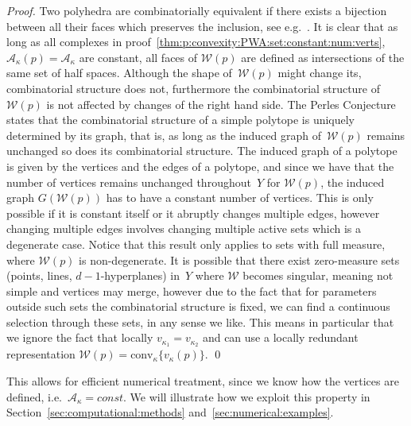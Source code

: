 \documentclass[smallextended]{svjour3}       %
\numberwithin{equation}{section}
\providecommand{\conv}{\text{conv}}
\begin{document}
\begin{proof}
Two polyhedra are combinatorially equivalent if there exists a bijection between all their faces which preserves the inclusion, see e.g.~\cite{Ziegler:1995}.
%
It is clear that as long as all complexes in proof~\ref{thm:p:convexity:PWA:set:constant:num:verts}, $\mathcal A_\kappa(p)=\mathcal A_\kappa$ are constant, all faces of $\mathcal W(p)$ are defined as intersections of the same set of half spaces.
%
Although the shape of~$\mathcal W(p)$ might change its, combinatorial structure does not, furthermore the combinatorial structure of $\mathcal W(p)$ is not affected by changes of the right hand side.
%
The Perles Conjecture~\cite{Kalai:1988} states that the combinatorial structure of a simple polytope is uniquely determined by its graph, that is, as long as the induced graph of~$\mathcal W(p)$ remains unchanged so does its combinatorial structure.
%
The induced graph of a polytope is given by the vertices and the edges of a polytope, and since we have that the number of vertices remains unchanged throughout~$Y$ for $\mathcal W(p)$, the induced graph $G(\mathcal W(p))$ has to have a constant number of vertices.
%
This is only possible if it is constant itself or it abruptly changes multiple edges, however changing multiple edges involves changing multiple active sets which is a degenerate case.
%
Notice that this result only applies to sets with full measure, where $\mathcal W(p)$ is non-degenerate.
%
It is possible that there exist zero-measure sets (points, lines, $d-1$-hyperplanes) in~$Y$ where $\mathcal W$ becomes singular, meaning not simple
and vertices may merge, however due to the fact that for parameters outside such sets the combinatorial structure is fixed, we can find a  continuous selection through these sets, in any sense we like.
%
This means in particular that we ignore the fact that locally $v_{\kappa_1}=v_{\kappa_2}$ and can
 use a locally redundant representation $\mathcal W(p) = \conv_\kappa\{v_\kappa(p)\}$.
\qed
\end{proof}
%
This allows for efficient numerical treatment, since we know how the vertices are defined, i.e.~$\mathcal A_\kappa = const$.
%
We will illustrate how we exploit this property in Section~\ref{sec:computational:methods} and~\ref{sec:numerical:examples}.
%
\end{document}
